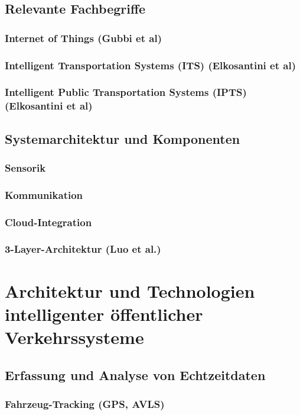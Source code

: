 \documentclass[ngerman]{seminarbeitrag} %
\begin{document}
\subsection{Relevante Fachbegriffe} %
\subsubsection{Internet of Things (Gubbi et al)}
\subsubsection{Intelligent Transportation Systems (ITS) (Elkosantini et al)}
\subsubsection{Intelligent Public Transportation Systems (IPTS) (Elkosantini et al)}
\subsection{Systemarchitektur und Komponenten}
\subsubsection{Sensorik}
\subsubsection{Kommunikation}
\subsubsection{Cloud-Integration}
\subsubsection{3-Layer-Architektur (Luo et al.)}

\pagebreak
\section{Architektur und Technologien intelligenter öffentlicher Verkehrssysteme}
\subsection{Erfassung und Analyse von Echtzeitdaten}
\subsubsection{Fahrzeug-Tracking (GPS, AVLS)} 
\end{document}
